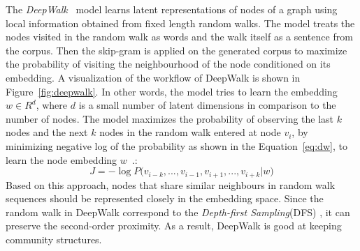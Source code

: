 The \emph{DeepWalk}~ model learns latent representations of nodes of a graph using local information obtained from fixed length random walks. The model treats the nodes visited in the random walk as words and the walk itself as  a sentence from the corpus. Then the skip-gram is applied on the generated corpus to maximize the probability of visiting the neighbourhood of the node conditioned on its embedding. A visualization of the workflow of DeepWalk is shown in Figure~\ref{fig:deepwalk}. In other words, the model tries to learn the embedding $w\in R^{ d} $, where $d$ is a small number of latent dimensions in comparison to the number of nodes. The model maximizes the probability of observing the last $k$ nodes and the next $k$ nodes in the random walk entered at node $v_{i}$, by minimizing negative log of the probability as shown in the Equation~\ref{eq:dw}, to learn the node embedding $w$~.: 
\begin{equation}
J=-\log { P( } v_{ { i−k } },...,v_{ i−1 },v_{ i+1 },...,v_{ i+k }|w )
\label{eq:dw}
\end{equation}
Based on this approach, nodes that share similar neighbours in random walk sequences should be represented closely in the embedding space. Since the random walk in DeepWalk correspond to the \emph{Depth-first Sampling}(DFS) , it can preserve the second-order proximity. As a result, DeepWalk is good at keeping community structures. 
